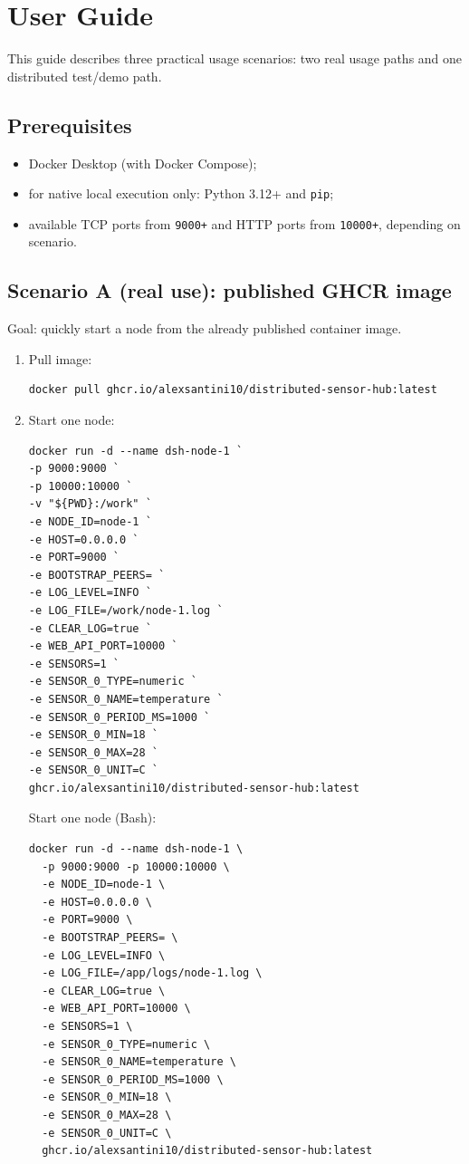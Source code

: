 \section{User Guide}\label{user-guide}

This guide describes three practical usage scenarios: two real usage paths and one distributed test/demo path.

\subsection{Prerequisites}
\begin{itemize}
  \item Docker Desktop (with Docker Compose);
  \item for native local execution only: Python 3.12+ and \texttt{pip};
  \item available TCP ports from \texttt{9000+} and HTTP ports from \texttt{10000+}, depending on scenario.
\end{itemize}

\subsection{Scenario A (real use): published GHCR image}

Goal: quickly start a node from the already published container image.

\begin{enumerate}
  \item Pull image:
\begin{verbatim}
docker pull ghcr.io/alexsantini10/distributed-sensor-hub:latest
\end{verbatim}
  \item Start one node:
\begin{verbatim}
docker run -d --name dsh-node-1 `
-p 9000:9000 `
-p 10000:10000 `
-v "${PWD}:/work" `
-e NODE_ID=node-1 `
-e HOST=0.0.0.0 `
-e PORT=9000 `
-e BOOTSTRAP_PEERS= `
-e LOG_LEVEL=INFO `
-e LOG_FILE=/work/node-1.log `
-e CLEAR_LOG=true `
-e WEB_API_PORT=10000 `
-e SENSORS=1 `
-e SENSOR_0_TYPE=numeric `
-e SENSOR_0_NAME=temperature `
-e SENSOR_0_PERIOD_MS=1000 `
-e SENSOR_0_MIN=18 `
-e SENSOR_0_MAX=28 `
-e SENSOR_0_UNIT=C `
ghcr.io/alexsantini10/distributed-sensor-hub:latest
\end{verbatim}
  Start one node (Bash):
\begin{verbatim}
docker run -d --name dsh-node-1 \
  -p 9000:9000 -p 10000:10000 \
  -e NODE_ID=node-1 \
  -e HOST=0.0.0.0 \
  -e PORT=9000 \
  -e BOOTSTRAP_PEERS= \
  -e LOG_LEVEL=INFO \
  -e LOG_FILE=/app/logs/node-1.log \
  -e CLEAR_LOG=true \
  -e WEB_API_PORT=10000 \
  -e SENSORS=1 \
  -e SENSOR_0_TYPE=numeric \
  -e SENSOR_0_NAME=temperature \
  -e SENSOR_0_PERIOD_MS=1000 \
  -e SENSOR_0_MIN=18 \
  -e SENSOR_0_MAX=28 \
  -e SENSOR_0_UNIT=C \
  ghcr.io/alexsantini10/distributed-sensor-hub:latest
\end{verbatim}
\end{enumerate}

